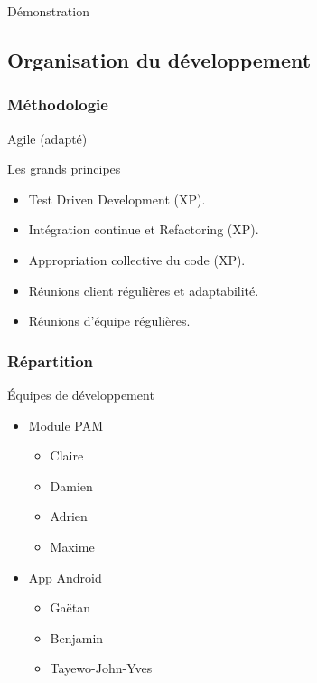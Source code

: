 \documentclass[xcolor=table]{beamer}
\begin{document}
\begin{frame}
\begin{center}
\Huge{Démonstration}
\end{center}
\end{frame}


\subsection{Organisation du développement}

\begin{frame}
\frametitle{Méthodologie}
\begin{center}
\Huge Agile (adapté)
\normalsize
\begin{block}{Les grands principes}
\begin{itemize}
 \item Test Driven Development (XP).
 \item Intégration continue et Refactoring (XP).
 \item Appropriation collective du code (XP).
 \item Réunions client régulières et adaptabilité.
 \item Réunions d'équipe régulières.
\end{itemize}
\end{block}
\end{center}

\end{frame}

\begin{frame}
\frametitle{Répartition}
\begin{block}{Équipes de développement}
  \begin{itemize}
    \item Module PAM
    \begin{itemize}
      \item Claire 
      \item Damien 
      \item Adrien 
      \item Maxime 
    \end{itemize}
    \item App Android
    \begin{itemize}
      \item Gaëtan 
      \item Benjamin 
      \item Tayewo-John-Yves 
    \end{itemize}
  \end{itemize}
\end{block}
\end{frame}
\end{document}
